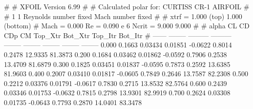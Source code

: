 #  
#       XFOIL         Version 6.99
#  
# Calculated polar for: CURTISS CR-1 AIRFOIL                            
#  
# 1 1 Reynolds number fixed          Mach number fixed         
#  
# xtrf =   1.000 (top)        1.000 (bottom)  
# Mach =   0.000     Re =     0.090 e 6     Ncrit =   9.000  9.000
#  
#   alpha    CL        CD       CDp       CM     Top_Xtr  Bot_Xtr  Top_Itr  Bot_Itr
#  ------ -------- --------- --------- -------- -------- -------- -------- --------
   0.000   0.1663   0.03434   0.01851  -0.0622   0.8014   0.2478  12.9335  81.3873
   0.200   0.1684   0.03462   0.01862  -0.0592   0.7906   0.2538  13.4709  81.6879
   0.300   0.1825   0.03451   0.01837  -0.0595   0.7873   0.2592  13.6385  81.9603
   0.400   0.2007   0.03410   0.01817  -0.0605   0.7849   0.2646  13.7587  82.2308
   0.500   0.2212   0.03376   0.01791  -0.0617   0.7830   0.2715  13.8532  82.5764
   0.600   0.2439   0.03346   0.01753  -0.0632   0.7815   0.2798  13.9301  82.9919
   0.700   0.2624   0.03308   0.01735  -0.0643   0.7793   0.2870  14.0401  83.3478
